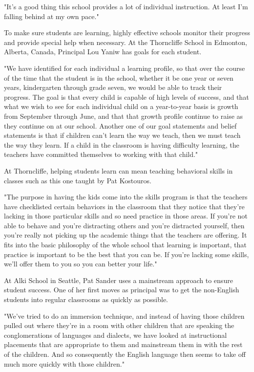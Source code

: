 "It's a good thing this school provides a lot of individual instruction. At least I'm falling behind at my own pace."

To make sure students are learning, highly effective schools monitor their progress and provide special help when necessary. At the Thorncliffe School in Edmonton, Alberta, Canada, Principal Lou Yaniw has goals for each student.

"We have identified for each individual a learning profile, so that over the course of the time that the student is in the school, whether it be one year or seven years, kindergarten through grade seven, we would be able to track their progress. The goal is that every child is capable of high levels of success, and that what we wish to see for each individual child on a year-to-year basis is growth from September through June, and that that growth profile continue to raise as they continue on at our school. Another one of our goal statements and belief statements is that if children can't learn the way we teach, then we must teach the way they learn. If a child in the classroom is having difficulty learning, the teachers have committed themselves to working with that child."

At Thorncliffe, helping students learn can mean teaching behavioral skills in classes such as this one taught by Pat Kostouros.

"The purpose in having the kids come into the skills program is that the teachers have checklisted certain behaviors in the classroom that they notice that they're lacking in those particular skills and so need practice in those areas. If you're not able to behave and you're distracting others and you're distracted yourself, then you're really not picking up the academic things that the teachers are offering. It fits into the basic philosophy of the whole school that learning is important, that practice is important to be the best that you can be. If you're lacking some skills, we'll offer them to you so you can better your life."

At Alki School in Seattle, Pat Sander uses a mainstream approach to ensure student success. One of her first moves as principal was to get the non-English students into regular classrooms as quickly as possible.

"We've tried to do an immersion technique, and instead of having those children pulled out where they're in a room with other children that are speaking the conglomerations of languages and dialects, we have looked at instructional placements that are appropriate to them and mainstream them in with the rest of the children. And so consequently the English language then seems to take off much more quickly with those children."

